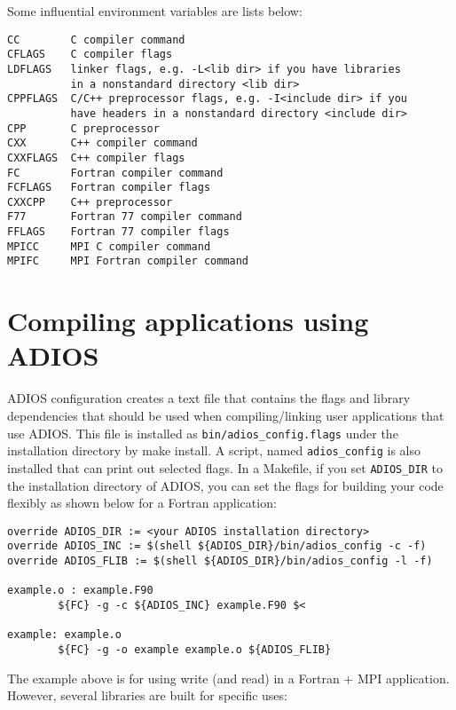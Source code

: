 Some influential environment variables are lists below:

\begin{lstlisting}
CC        C compiler command
CFLAGS    C compiler flags
LDFLAGS   linker flags, e.g. -L<lib dir> if you have libraries 
          in a nonstandard directory <lib dir>
CPPFLAGS  C/C++ preprocessor flags, e.g. -I<include dir> if you
          have headers in a nonstandard directory <include dir>
CPP       C preprocessor
CXX       C++ compiler command
CXXFLAGS  C++ compiler flags
FC        Fortran compiler command
FCFLAGS   Fortran compiler flags
CXXCPP    C++ preprocessor
F77       Fortran 77 compiler command
FFLAGS    Fortran 77 compiler flags
MPICC     MPI C compiler command
MPIFC     MPI Fortran compiler command
\end{lstlisting}


\section{Compiling applications using ADIOS}
\label{section:installation_compiling_apps}

ADIOS configuration creates a text file that contains the flags and library dependencies 
that should be used when compiling/linking user applications that use ADIOS. This 
file is installed as \verb+bin/adios_config.flags+ under the installation directory by 
make install. A script, named \verb+adios_config+ is also installed that can print out 
selected flags. In a Makefile, if you set \verb+ADIOS_DIR+ to the installation directory 
of ADIOS, you can set the flags for building your code flexibly as shown below 
for a Fortran application: 

\begin{lstlisting}
override ADIOS_DIR := <your ADIOS installation directory>
override ADIOS_INC := $(shell ${ADIOS_DIR}/bin/adios_config -c -f)
override ADIOS_FLIB := $(shell ${ADIOS_DIR}/bin/adios_config -l -f)

example.o : example.F90
        ${FC} -g -c ${ADIOS_INC} example.F90 $<

example: example.o
        ${FC} -g -o example example.o ${ADIOS_FLIB} 
\end{lstlisting}

The example above is for using write (and read) in a Fortran + MPI application. However, several libraries are built for specific uses:

